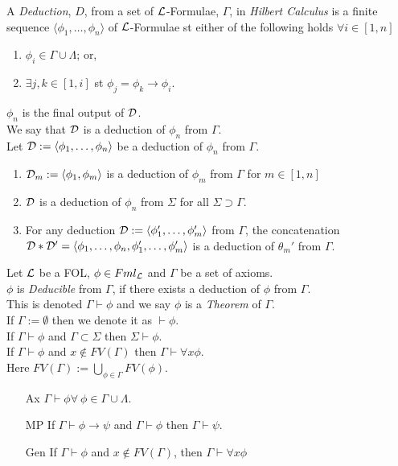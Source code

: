 \documentclass[11pt,a4paper]{article}
\begin{document}
A \textit{Deduction}, $D$, from a set of $\mathcal{L}$-Formulae, $\Gamma$, in \textit{Hilbert Calculus} is a finite sequence $\langle\phi_1,\dots,\phi_n\rangle$ of $\mathcal{L}$-Formulae st either of the following holds $\forall i\in[1,n]$
\begin{enumerate}
	\item $\phi_i\in\Gamma\cup\Lambda$; or,
	\item $\exists j,k\in[1,i]$ st $\phi_j=\phi_k\to\phi_i$.
\end{enumerate}
$\phi_n$ is the final output of $\mathcal{D}$.\\
\nb We say that $\mathcal{D}$ is a deduction of $\phi_n$ from $\Gamma$.\\

\proposition{}
Let $\mathcal{D}:=\langle\phi_1,\dots,\phi_n\rangle$ be a deduction of $\phi_n$ from $\Gamma$.
\begin{enumerate}
	\item $\mathcal{D}_m:=\langle \phi_1,\phi_m\rangle$ is a deduction of $\phi_m$ from $\Gamma$ for $m\in[1,n]$ %
	\item $\mathcal{D}$ is a deduction of $\phi_n$ from $\Sigma$ for all $\Sigma\supset\Gamma$.
	\item For any deduction $\mathcal{D}:=\langle\phi_1',\dots,\phi_m'\rangle$ from $\Gamma$, the concatenation $\mathcal{D}*\mathcal{D}'=\langle\phi_1,\dots,\phi_n,\phi_1',\dots,\phi_m'\rangle$ is a deduction of $\theta_{m}'$ from $\Gamma$.
\end{enumerate}

Let $\mathcal{L}$ be a FOL, $\phi\in Fml_{\mathcal{L}}$ and $\Gamma$ be a set of axioms.\\
$\phi$ is \textit{Deducible} from $\Gamma$, if there exists a deduction of $\phi$ from $\Gamma$.\\
\nb This is denoted $\Gamma\vdash\phi$ and we say $\phi$ is a \textit{Theorem} of $\Gamma$.\\
\nb If $\Gamma:=\emptyset$ then we denote it as $\vdash\phi$.\\

If $\Gamma\vdash\phi$ and $\Gamma\subset\Sigma$ then $\Sigma\vdash\phi$.\\

If $\Gamma\vdash\phi$ and $x\not\in FV(\Gamma)$ then $\Gamma\vdash\forall x\phi$.\\
Here $FV(\Gamma):=\bigcup\limits_{\phi\in\Gamma}FV(\phi)$.\\

\theoremm{}
\begin{itemize}
	\item[Ax] $\Gamma\vdash\phi\forall\ \phi\in\Gamma\cup\Lambda$.
	\item[MP] If $\Gamma\vdash\phi\to\psi$ and $\Gamma\vdash\phi$ then $\Gamma\vdash\psi$.
	\item[Gen] If $\Gamma\vdash\phi$ and $x\not\in FV(\Gamma)$, then $\Gamma\vdash\forall x\phi$
\end{itemize}
\end{document}

